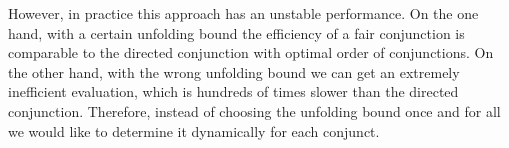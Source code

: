 However, in practice this approach has an unstable performance. On the one hand, with a certain unfolding bound the efficiency of a fair conjunction is comparable to the directed conjunction
with optimal order of conjunctions. On the other hand, with the wrong unfolding bound we can get an extremely inefficient evaluation, which is hundreds of times slower than the directed
conjunction. Therefore, instead of choosing the unfolding bound once and for all we would like to determine it dynamically for each conjunct.

